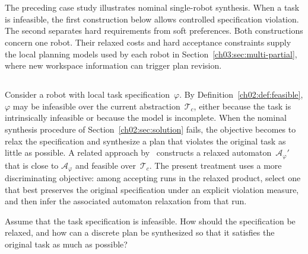 \begingroup\color{blue}
\section{}
\label{ch02:sec:task_relaxation}

\begin{revision}
The preceding case study illustrates nominal single-robot synthesis.
When a task is infeasible, the first construction below allows controlled
specification violation. The second separates hard requirements from soft
preferences. Both constructions concern one robot. Their relaxed costs and
hard acceptance constraints supply the local planning models used by each
robot in Section~\ref{ch03:sec:multi-partial}, where new workspace information
can trigger plan revision.
\end{revision}

\subsection{}\label{ch03:sec:infeasible}

 Consider a robot with local task specification~$\varphi$. By
Definition~\ref{ch02:def:feasible}, $\varphi$ may be infeasible over the
current abstraction~$\mathcal{T}_c$, either because the task is intrinsically
infeasible or because the model is incomplete. When the nominal synthesis
procedure of Section~\ref{ch02:sec:solution} fails, the objective becomes to
relax the specification and synthesize a plan that violates the original task as
little as possible.
A related approach by~\citet{kim2012approximate} constructs a relaxed
automaton~$\mathcal{A}_{\varphi}'$ that is close to
$\mathcal{A}_{\varphi}$ and feasible over~$\mathcal{T}_c$. The present
treatment uses a more discriminating objective: among accepting runs in the
relaxed product, select one that best preserves the original specification
under an explicit violation measure, and then infer the associated automaton
relaxation from that run.

\begin{problem}
Assume that the task specification is infeasible. How should the specification
be relaxed, and how can a discrete plan be synthesized so that it satisfies the
original task as much as possible?
\end{problem}


